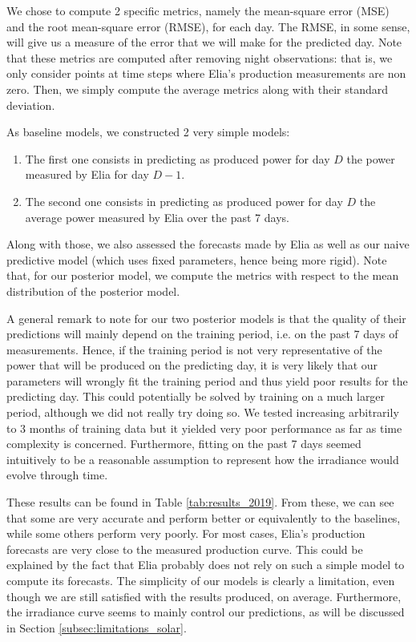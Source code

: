 \documentclass[a4paper, 12pt]{article}
\begin{document}
We chose to compute 2 specific metrics, namely the mean-square error (MSE) and the root mean-square error (RMSE), for each day. The RMSE, in some sense, will give us a measure of the error that we will make for the predicted day. Note that these metrics are computed after removing night observations: that is, we only consider points at time steps where Elia's production measurements are non zero. Then, we simply compute the average metrics along with their standard deviation.

As baseline models, we constructed 2 very simple models:
\begin{enumerate}
    \item The first one consists in predicting as produced power for day $D$ the power measured by Elia for day $D-1$.
    \item The second one consists in predicting as produced power for day $D$ the average power measured by Elia over the past 7 days.
\end{enumerate}

Along with those, we also assessed the forecasts made by Elia as well as our naive predictive model (which uses fixed parameters, hence being more rigid). Note that, for our posterior model, we compute the metrics with respect to the mean distribution of the posterior model.

A general remark to note for our two posterior models is that the quality of their predictions will mainly depend on the training period, i.e. on the past 7 days of measurements. Hence, if the training period is not very representative of the power that will be produced on the predicting day, it is very likely that our parameters will wrongly fit the training period and thus yield poor results for the predicting day. This could potentially be solved by training on a much larger period, although we did not really try doing so.  We tested increasing arbitrarily to 3 months of training data but it yielded very poor performance as far as time complexity is concerned. Furthermore, fitting on the past 7 days seemed intuitively to be a reasonable assumption to represent how the irradiance would evolve through time.

These results can be found in Table \ref{tab:results_2019}. From these, we can see that some are very accurate and perform better or equivalently to the baselines, while some others perform very poorly. For most cases, Elia's production forecasts are very close to the measured production curve. This could be explained by the fact that Elia probably does not rely on such a simple model to compute its forecasts. The simplicity of our models is clearly a limitation, even though we are still satisfied with the results produced, on average. Furthermore, the irradiance curve seems to mainly control our predictions, as will be discussed in Section \ref{subsec:limitations_solar}.
\end{document}
